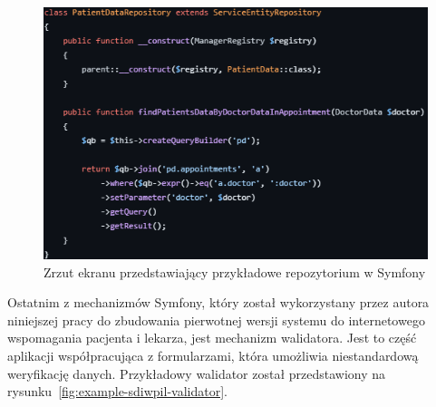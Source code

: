 \documentclass[12pt,twoside]{book}
\newcommand{\captionvspace}{\vspace{6pt}}
\begin{document}
    \begin{figure}[ht]
        \centering
        \includegraphics[width=\textwidth]{includes/images/example-repository-before-migration.png}
        \captionvspace
        \caption{Zrzut ekranu przedstawiający przykładowe repozytorium w Symfony}
        \label{fig:example-sdiwpil-repository}
    \end{figure}

    Ostatnim z mechanizmów Symfony, który został wykorzystany przez autora niniejszej pracy do zbudowania pierwotnej wersji systemu do internetowego wspomagania pacjenta i lekarza, jest mechanizm walidatora. Jest to część aplikacji współpracująca z formularzami, która umożliwia niestandardową weryfikację danych. Przykładowy walidator został przedstawiony na rysunku~\ref{fig:example-sdiwpil-validator}.
\end{document}
